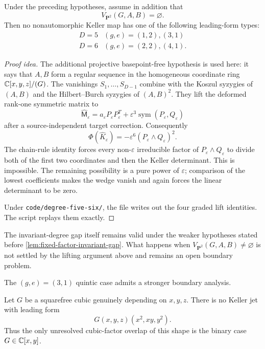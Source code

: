 \begin{theorem}
\label{thm:degree-five-six-fixed-factor}
Under the preceding hypotheses, assume in addition that
\[
V_{\mathbf P^2}(G,A,B)=\varnothing.
\]
Then no nonautomorphic Keller map has one of the following leading-form
types:
\[
\begin{array}{c|c}
D=5&(g,e)=(1,2),(3,1)\\
D=6&(g,e)=(2,2),(4,1).
\end{array}
\]
\end{theorem}

\begin{proof}[Proof idea]
The additional projective basepoint-free hypothesis is used here: it says
that \(A,B\) form a regular sequence in the homogeneous coordinate ring
\(\mathbb C[x,y,z]/(G)\).  The vanishings \(S_1,\ldots,S_{D-1}\) combine with the
Koszul syzygies of \((A,B)\) and the Hilbert--Burch syzygies of
\((A,B)^2\).  They lift the
deformed rank-one symmetric matrix to
\[
\widehat{\mathsf M}_\varepsilon
=a_\varepsilon P_\varepsilon P_\varepsilon^T
+\varepsilon^3\operatorname{sym}(P_\varepsilon,Q_\varepsilon)
\]
after a source-independent target correction.  Consequently
\[
\Phi(\widehat K_\varepsilon)
=-\varepsilon^6(P_\varepsilon\wedge Q_\varepsilon)^2.
\]
The chain-rule identity forces every non-\(\varepsilon\) irreducible factor
of \(P_\varepsilon\wedge Q_\varepsilon\) to divide both of the first two
coordinates and then the Keller determinant.  This is impossible.  The
remaining possibility is a pure power of \(\varepsilon\); comparison of the
lowest coefficients makes the wedge vanish and again forces the linear
determinant to be zero.

Under \texttt{code/degree-five-six/}, the file
 writes out the four
graded lift identities.  The script
 replays them exactly.
\end{proof}

The invariant-degree gap itself remains valid under the weaker hypotheses
stated before \cref{lem:fixed-factor-invariant-gap}.  What happens when
\(V_{\mathbf P^2}(G,A,B)\ne\varnothing\) is not settled by the lifting
argument above and remains an open boundary problem.

The \((g,e)=(3,1)\) quintic case admits a stronger boundary analysis.

\begin{theorem}
\label{thm:quintic-three-variable-cubic-factor}
Let \(G\) be a squarefree cubic genuinely depending on \(x,y,z\).  There is
no Keller jet with leading form
\[
G(x,y,z)(x^2,xy,y^2).
\]
Thus the only unresolved cubic-factor overlap of this shape is the binary
case \(G\in\mathbb C[x,y]\).
\end{theorem}

